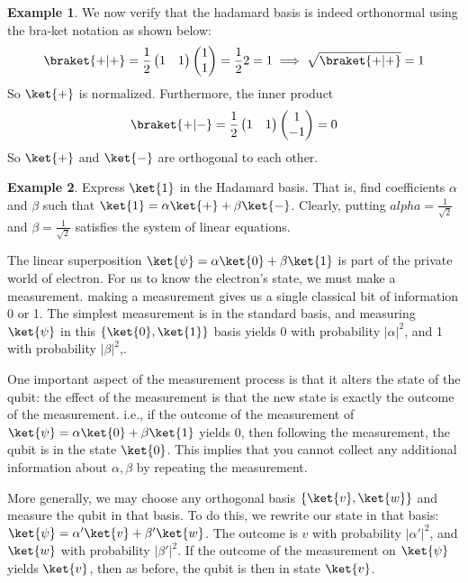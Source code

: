 \documentclass[12pt, oneside]{book}
\theoremstyle{definition}
\theoremstyle{definition}
\newtheorem{example}{Example}[section]
\theoremstyle{remark}
\begin{document}
\begin{example}
    We now verify that the hadamard basis is indeed orthonormal using the bra-ket notation as shown below:
    \[
    \braket{+|+}=\frac{1}{2} \begin{pmatrix} 1 & 1 \end{pmatrix} \begin{pmatrix} 1 \\ 1 \end{pmatrix} =\frac{1}{2}2=1\implies \sqrt{\braket{+|+}}=1
    \]
    So $\ket{+}$ is normalized. Furthermore, the inner product
    \[
    \braket{+|-}=\frac{1}{2}\begin{pmatrix} 1 & 1 \end{pmatrix} \begin{pmatrix} 1 \\ -1 \end{pmatrix} = 0
    \]
    So $\ket{+}$ and $\ket{-}$ are orthogonal to each other.
\end{example}

\begin{example}
    Express $\ket{1}$ in the Hadamard basis. That is, find coefficients $\alpha$ and $\beta$ such that $\ket{1}=\alpha\ket{+}+\beta\ket{-}$.
    Clearly, putting $alpha=\frac{1}{\sqrt{2}}$ and $\beta=\frac{1}{\sqrt{2}}$ satisfies the system of linear equations.
\end{example}

The linear superposition $\ket{\psi}=\alpha\ket{0}+\beta \ket{1}$ is part of the private world of electron. For us to know the electron's state, we must make a measurement. making a measurement gives us a single classical bit of information 0 or 1. The simplest measurement is in the standard basis, and measuring $\ket{\psi}$ in this $\{\ket{0},\ket{1}\}$ basis yields 0 with probability $|\alpha|^2$, and 1 with probability $|\beta|^2$,.

One important aspect of the measurement process is that it alters the state of the qubit: the effect of the measurement is that the new state is exactly the outcome of the measurement. i.e., if the outcome of the measurement of $\ket{\psi}=\alpha \ket{0}+\beta\ket{1}$ yields 0, then following the measurement, the qubit is in the state $\ket{0}$. This implies that you cannot collect any additional information about $\alpha,\beta$ by repeating the measurement.

More generally, we may choose any orthogonal basis $\{\ket{v},\ket{w}\}$ and measure the qubit in that basis. To do this, we rewrite our state in that basis: $\ket{\psi}=\alpha'\ket{v}+\beta'\ket{w}$. The outcome is $v$ with probability $|\alpha'|^2$, and $\ket{w}$ with probability $|\beta'|^2$. If the outcome of the measurement on $\ket{\psi}$ yields $\ket{v}$, then as before, the qubit is then in state $\ket{v}$.
\end{document}
